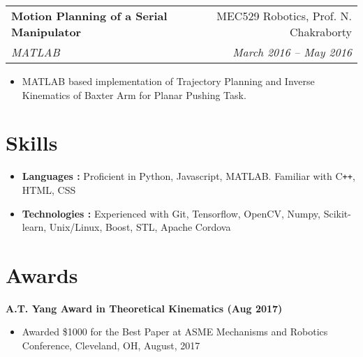 \documentclass[letterpaper,10pt]{article}
\makeatletter
\newcommand{\resumeHeading}[4]{
  \vspace{-1pt}
    \begin{tabular*}{0.97\textwidth}{l@{\extracolsep{\fill}}r}
      \textbf{#1} & #2 \\ %
      \textit{\small#3} & \textit{\small #4} \\
    \end{tabular*}
}
\newcommand{\resumeSubheading}[1]{
      {\small\textbf{#1}} \\
}
\newcommand{\resumeSection}[1]{
\vspace{-12pt}
\section{#1}
}
\newcommand{\resumeItemListStart}{
\vspace{-7pt}
\begin{itemize}[leftmargin=14pt]
}
\newcommand{\resumeItemListEnd}{
\vspace{+7pt}
\end{itemize}
}
\newcommand{\resumeItem}[1]{
  \item\small{
      {#1 \vspace{-7pt}
      }
  }
}
\makeatother
\begin{document}
    \resumeHeading{Motion Planning of a Serial Manipulator}{MEC529 Robotics, Prof. N. Chakraborty}{MATLAB}{March 2016 -- May 2016}
    \resumeItemListStart
      \resumeItem{MATLAB based implementation of Trajectory Planning and Inverse Kinematics of Baxter Arm for Planar Pushing Task.}
    \resumeItemListEnd


\resumeSection{Skills}
\vspace{+7pt}
    \resumeItemListStart
      \resumeItem{\textbf{Languages :} Proficient in Python, Javascript, MATLAB. Familiar with C\texttt{++}, HTML, CSS}
      \resumeItem{\textbf{Technologies :} Experienced with Git, Tensorflow, OpenCV, Numpy, Scikit-learn, Unix/Linux, Boost, STL, Apache Cordova}
    \resumeItemListEnd

\resumeSection{Awards}
    \resumeSubheading{A.T. Yang Award in Theoretical Kinematics (Aug 2017)}
    \resumeItemListStart
      \resumeItem{Awarded \$1000 for the Best Paper at ASME Mechanisms and Robotics Conference, Cleveland, OH, August, 2017}
    \resumeItemListEnd
\end{document}
